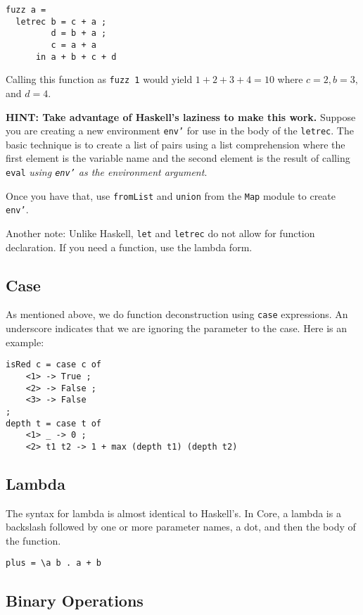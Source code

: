 \documentclass[11pt]{article}
\begin{document}
\begin{verbatim}
fuzz a =
  letrec b = c + a ;
         d = b + a ;
         c = a + a 
      in a + b + c + d
\end{verbatim}

Calling this function as \texttt{fuzz 1} would yield \(1 + 2 + 3 + 4 = 10\) where \(c = 2, b = 3,\) and \(d = 4\).

\textbf{HINT: Take advantage of Haskell's laziness to make this work.}  Suppose you are creating a new environment \texttt{env'} for
use in the body of the \texttt{letrec}.  The basic technique is to create a list of pairs using a list comprehension where the
first element is the variable name and the second element is the result of calling \texttt{eval}
\emph{using \texttt{env'} as the environment argument}.

Once you have that, use \texttt{fromList} and \texttt{union} from the \texttt{Map} module to create \texttt{env'}.

Another note: Unlike Haskell, \texttt{let} and \texttt{letrec} do not allow for function declaration.  If you need a function, use the lambda form.
\subsection{Case}
\label{sec:org5567001}

As mentioned above, we do function deconstruction using \texttt{case} expressions.  An underscore indicates that we are ignoring the parameter to
the case.  Here is an example:

\begin{verbatim}
isRed c = case c of
    <1> -> True ;
    <2> -> False ;
    <3> -> False
;
depth t = case t of
    <1> _ -> 0 ;
    <2> t1 t2 -> 1 + max (depth t1) (depth t2)
\end{verbatim}
\subsection{Lambda}
\label{sec:org43ddaa1}

The syntax for lambda is almost identical to Haskell's.  In Core, a lambda is a backslash followed by one or more parameter names,
a dot, and then the body of the function.

\begin{verbatim}
plus = \a b . a + b
\end{verbatim}
\subsection{Binary Operations}
\label{sec:org803c518}
\end{document}
